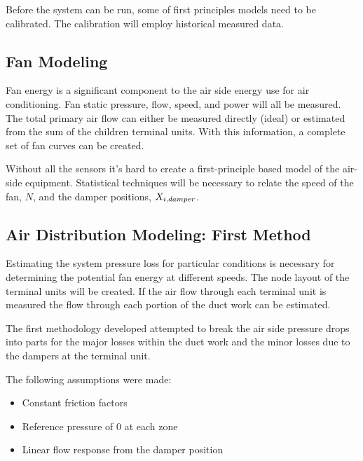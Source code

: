 Before the system can be run, some of first principles models need to be
calibrated. The calibration will employ historical measured data.

\subsection{Fan Modeling}\label{sec:FanModeling}

Fan energy is a significant component to the air side energy use for air
conditioning. Fan static pressure, flow, speed, and power will all be
measured.  The total primary air flow can either be measured directly
(ideal) or estimated from the sum of the children terminal units. With
this information, a complete set of fan curves can be created. 

Without all the sensors it's hard to create a first-principle based model
of the air-side equipment. Statistical techniques will be necessary to relate
the speed of the fan, \(\dot N\), and the damper positions,
\(X_{i,damper}\). 

\subsection{Air Distribution Modeling: First Method}

Estimating the system pressure loss for particular conditions is
necessary for determining the potential fan energy at different speeds.
The node layout of the terminal units will be created. If the air flow
through each terminal unit is measured the flow through each portion of
the duct work can be estimated. 

The first methodology developed attempted to break the air side pressure
drops into parts for the major losses within the duct work and the minor
losses due to the dampers at the terminal unit. 

The following assumptions were made:

\begin{itemize}
    \item Constant friction factors
    \item Reference pressure of 0 at each zone
    \item Linear flow response from the damper position
\end{itemize}


